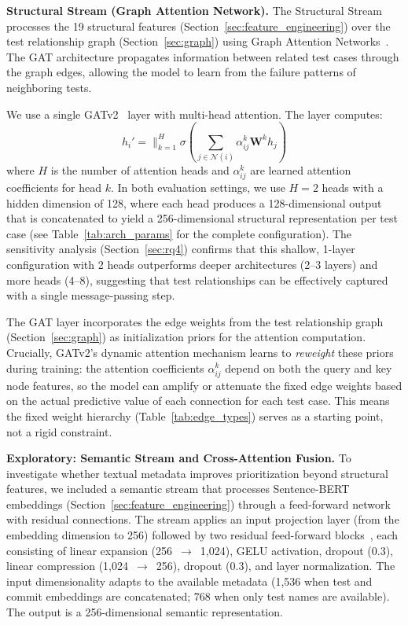 \documentclass[10pt,journal,compsoc]{IEEEtran}
\begin{document}
\textbf{Structural Stream (Graph Attention Network).}
The Structural Stream processes the 19 structural features
(Section~\ref{sec:feature_engineering}) over the test relationship graph
(Section~\ref{sec:graph}) using Graph Attention
Networks~\cite{velickovic2018graph}. The GAT architecture propagates
information between related test cases through the graph edges, allowing the
model to learn from the failure patterns of neighboring tests.

We use a single GATv2~\cite{brody2022attentive} layer with multi-head
attention. The layer computes:
\begin{equation}
    h_i' = \|_{k=1}^{H} \sigma\left(\sum_{j \in \mathcal{N}(i)} \alpha_{ij}^k \mathbf{W}^k h_j\right)
\end{equation}
where $H$ is the number of attention heads and $\alpha_{ij}^k$ are learned
attention coefficients for head $k$. In both evaluation settings, we use
$H = 2$ heads with a hidden dimension of 128, where each head produces a
128-dimensional output that is concatenated to yield a 256-dimensional
structural representation per test case (see Table~\ref{tab:arch_params}
for the complete configuration). The sensitivity analysis (Section~\ref{sec:rq4})
confirms that this shallow, 1-layer configuration with 2 heads outperforms
deeper architectures (2--3 layers) and more heads (4--8), suggesting that
test relationships can be effectively captured with a single message-passing
step.

The GAT layer incorporates the edge weights from the test relationship graph
(Section~\ref{sec:graph}) as initialization priors for the attention
computation. Crucially, GATv2's dynamic attention mechanism learns to
\emph{reweight} these priors during training: the attention coefficients
$\alpha_{ij}^k$ depend on both the query and key node features, so the model
can amplify or attenuate the fixed edge weights based on the actual predictive
value of each connection for each test case. This means the fixed weight
hierarchy (Table~\ref{tab:edge_types}) serves as a starting point, not a
rigid constraint.

\textbf{Exploratory: Semantic Stream and Cross-Attention Fusion.}
To investigate whether textual metadata improves prioritization beyond
structural features, we included a semantic stream that processes
Sentence-BERT embeddings (Section~\ref{sec:feature_engineering}) through a
feed-forward network with residual connections. The stream applies an input
projection layer (from the embedding dimension to 256) followed by two
residual feed-forward blocks~\cite{he2016deep}, each consisting of linear
expansion (256~$\rightarrow$~1,024), GELU activation, dropout (0.3), linear
compression (1,024~$\rightarrow$~256), dropout (0.3), and layer
normalization. The input dimensionality adapts to the available metadata
(1,536 when test and commit embeddings are concatenated; 768 when only test
names are available). The output is a 256-dimensional semantic
representation.
\end{document}

